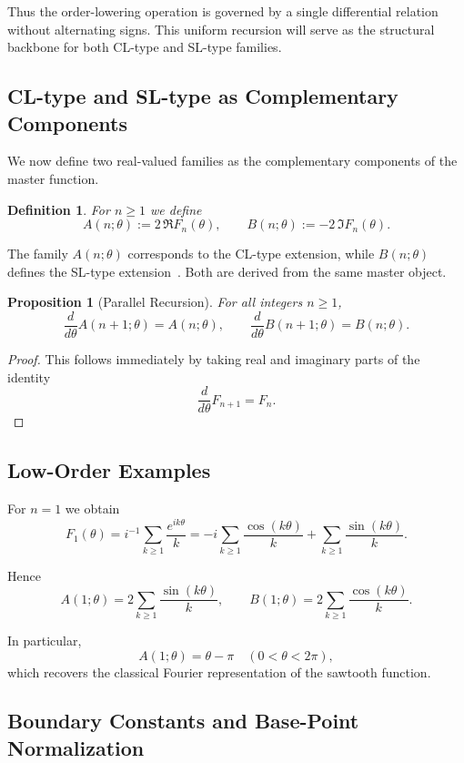 \documentclass[11pt]{article}
\newtheorem{proposition}{Proposition}[section]
\newtheorem{definition}{Definition}
\begin{document}
Thus the order-lowering operation is governed by a single
differential relation without alternating signs.
This uniform recursion will serve as the structural backbone
for both CL-type and SL-type families.


\subsection{CL-type and SL-type as Complementary Components}

We now define two real-valued families as the complementary
components of the master function.

\begin{definition}
For $n\ge1$ we define
\[
A(n;\theta):=2\,\Re F_n(\theta),
\qquad
B(n;\theta):=-2\,\Im F_n(\theta).
\]
\end{definition}

The family $A(n;\theta)$ corresponds to the CL-type extension,
while $B(n;\theta)$ defines the SL-type extension~\cite{Lewin1981}.
Both are derived from the same master object.

\begin{proposition}[Parallel Recursion]
For all integers $n\ge1$,
\[
\frac{d}{d\theta}A(n+1;\theta)=A(n;\theta),
\qquad
\frac{d}{d\theta}B(n+1;\theta)=B(n;\theta).
\]
\end{proposition}

\begin{proof}
This follows immediately by taking real and imaginary parts
of the identity
\[
\frac{d}{d\theta}F_{n+1}=F_n.
\]
\end{proof}


\subsection{Low-Order Examples}

For $n=1$ we obtain
\[
F_1(\theta)
=
i^{-1}\sum_{k\ge1}\frac{e^{ik\theta}}{k}
=
-i\sum_{k\ge1}\frac{\cos(k\theta)}{k}
+\sum_{k\ge1}\frac{\sin(k\theta)}{k}.
\]

Hence
\[
A(1;\theta)
=
2\sum_{k\ge1}\frac{\sin(k\theta)}{k},
\qquad
B(1;\theta)
=
2\sum_{k\ge1}\frac{\cos(k\theta)}{k}.
\]

In particular,
\[
A(1;\theta)=\theta-\pi
\quad (0<\theta<2\pi),
\]
which recovers the classical Fourier representation
of the sawtooth function.


\subsection{Boundary Constants and Base-Point Normalization}
\end{document}
